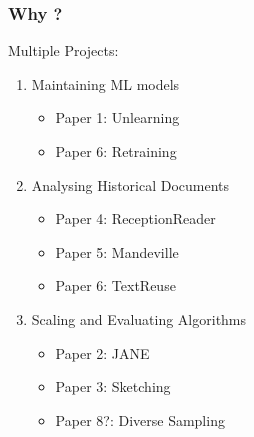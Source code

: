 \documentclass[pdf]{beamer}
\begin{document}
\begin{frame}
    \frametitle{Why ?}

    Multiple Projects:
    \begin{enumerate}
        \item Maintaining ML models
        \begin{itemize}
            \item Paper 1: Unlearning 
            \item Paper 6: Retraining
        \end{itemize}
        \item Analysing Historical Documents 
        \begin{itemize}
            \item Paper 4: ReceptionReader
            \item Paper 5: Mandeville
            \item Paper 6: TextReuse
        \end{itemize}
        \item Scaling and Evaluating Algorithms
        \begin{itemize}
            \item Paper 2: JANE
            \item Paper 3: Sketching 
            \item Paper 8?: Diverse Sampling 
        \end{itemize}
    \end{enumerate}

\end{frame}
\end{document}
